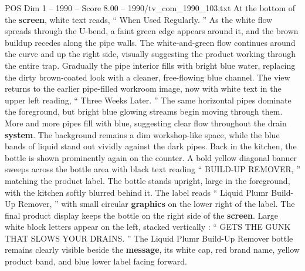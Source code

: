 \begin{textsample}{POS Dim 1 – 1990 – Score 8.00 – 1990/tv\_com\_1990\_103.txt}
At the bottom of the \textbf{screen}, white text reads, “ When Used Regularly. ” As the white flow spreads through the U-bend, a faint green edge appears around it, and the brown buildup recedes along the pipe walls.
The white-and-green flow continues around the curve and up the right side, visually suggesting the product working through the entire trap.
Gradually the pipe interior fills with bright blue water, replacing the dirty brown-coated look with a cleaner, free-flowing blue channel.
The view returns to the earlier pipe-filled workroom image, now with white text in the upper left reading, “ Three Weeks Later. ” The same horizontal pipes dominate the foreground, but bright blue glowing streams begin moving through them.
More and more pipes fill with blue, suggesting clear flow throughout the drain \textbf{system}.
The background remains a dim workshop-like space, while the blue bands of liquid stand out vividly against the dark pipes.
Back in the kitchen, the bottle is shown prominently again on the counter.
A bold yellow diagonal banner sweeps across the bottle area with black text reading “ BUILD-UP REMOVER, ” matching the product label.
The bottle stands upright, large in the foreground, with the kitchen softly blurred behind it.
The label reads “ Liquid Plumr Build-Up Remover, ” with small circular \textbf{graphics} on the lower right of the label.
The final product display keeps the bottle on the right side of the \textbf{screen}.
Large white block letters appear on the left, stacked vertically : “ GETS THE GUNK THAT SLOWS YOUR DRAINS. ” The Liquid Plumr Build-Up Remover bottle remains clearly visible beside the \textbf{message}, its white cap, red brand name, yellow product band, and blue lower label facing forward.

\end{textsample}

